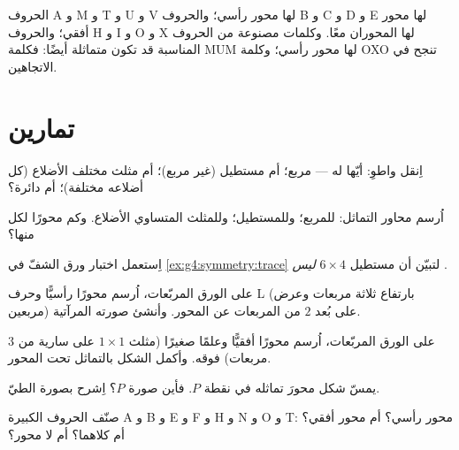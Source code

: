 \begin{example}\label{ex:g4:symmetry:letters}
الحروف A و M و T و U و V لها محور رأسي؛ والحروف B و C و D و E لها
محور أفقي؛ والحروف H و I و O و X لها المحوران معًا. وكلمات مصنوعة
من الحروف المناسبة قد تكون متماثلة أيضًا: فكلمة MUM لها محور
رأسي؛ وكلمة OXO تنجح في الاتجاهين.
\end{example}

\section{تمارين}

\begin{exercise}[$\star$]\label{exo:g4:symmetry:1}
اِنقل واطوِ: أيّها له  --- مربع؛
أم مستطيل (غير مربع)؛ أم مثلث مختلف الأضلاع (كل أضلاعه
مختلفة)؛ أم دائرة؟
\end{exercise}

\begin{exercise}[$\star$]\label{exo:g4:symmetry:2}
اُرسم محاور التماثل: للمربع؛ وللمستطيل؛ وللمثلث المتساوي
الأضلاع. وكم محورًا لكل منها؟
\end{exercise}

\begin{exercise}[$\star$]\label{exo:g4:symmetry:3}
اِستعمل اختبار ورق الشفّ في \cref{ex:g4:symmetry:trace} لتبيّن
أن  مستطيل $6 \times 4$ \emph{ليس} .
\end{exercise}

\begin{exercise}[$\star$]\label{exo:g4:symmetry:4}
على الورق المربّعات، اُرسم محورًا رأسيًّا وحرف L (بارتفاع ثلاثة
مربعات وعرض مربعين) على بُعد $2$ من المربعات عن المحور. وأنشئ
صورته المرآتية.
\end{exercise}

\begin{exercise}[$\star$]\label{exo:g4:symmetry:5}
على الورق المربّعات، اُرسم محورًا أفقيًّا وعلمًا صغيرًا (مثلث $1 \times
1$ على سارية من $3$ مربعات) فوقه. وأكمل الشكل
بالتماثل تحت المحور.
\end{exercise}

\begin{exercise}[$\star$]\label{exo:g4:symmetry:6}
يمسّ شكل محورَ تماثله في نقطة $P$. فأين صورة
$P$؟ اِشرح بصورة الطيّ.
\end{exercise}

\begin{exercise}[$\star$]\label{exo:g4:symmetry:7}
صنّف الحروف الكبيرة A و B و E و F و H و N و O و T: محور رأسي؟
أم محور أفقي؟ أم كلاهما؟ أم لا محور؟
\end{exercise}

